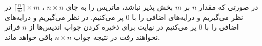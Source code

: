 \documentclass[conference]{IEEEtran-ModifiedForMVIP}
\begin{document}

در صورتی که مقدار $n$ بر $m$ بخش پذیر نباشد، 
ماتریس را به جای 
$n \times n$ ،
$ \lceil \frac{n}{m} \rceil \times m$
در نظر می‌گیریم و درایه‌های اضافی را با $0$ پر می‌کنیم.
در نظر می‌گیریم و درایه‌های اضافی را با $0$  پر می‌کنیم
در نهایت برای ذخیره کردن جواب اندیس‌ها از $n$ فراتر نخواهند رفت در نتیجه جواب $n \times n$ باقی خواهد ماند.

\newpage
‌

\end{document}
